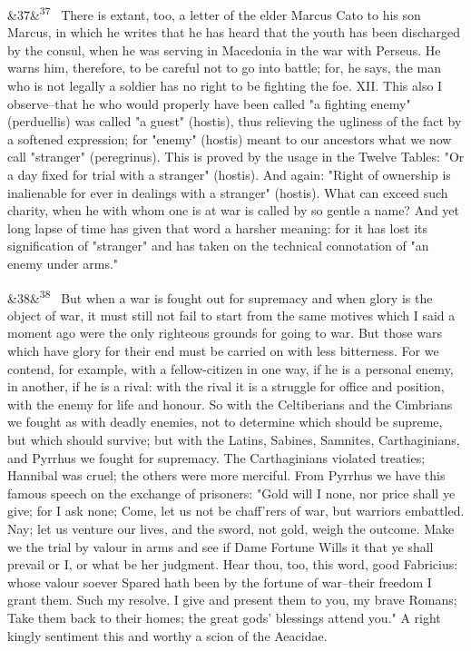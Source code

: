 \documentclass[12pt]{article}
\newcommand{\para}[1][]{\par\noindent\ifx&#1&\else\textsuperscript{\footnotesize #1}~\fi}
\begin{document}
\para[37] There is extant, too, a letter of the elder Marcus Cato to his son Marcus, in which he writes that he has heard that the youth has been discharged by the consul, when he was serving in Macedonia in the war with Perseus. He warns him, therefore, to be careful not to go into battle; for, he says, the man who is not legally a soldier has no right to be fighting the foe. XII. This also I observe--that he who would properly have been called "a fighting enemy" (perduellis) was called "a guest" (hostis), thus relieving the ugliness of the fact by a softened expression; for "enemy" (hostis) meant to our ancestors what we now call "stranger" (peregrinus). This is proved by the usage in the Twelve Tables: "Or a day fixed for trial with a stranger" (hostis). And again: "Right of ownership is inalienable for ever in dealings with a stranger" (hostis). What can exceed such charity, when he with whom one is at war is called by so gentle a name? And yet long lapse of time has given that word a harsher meaning: for it has lost its signification of "stranger" and has taken on the technical connotation of "an enemy under arms."

\para[38] But when a war is fought out for supremacy and when glory is the object of war, it must still not fail to start from the same motives which I said a moment ago were the only righteous grounds for going to war. But those wars which have glory for their end must be carried on with less bitterness. For we contend, for example, with a fellow-citizen in one way, if he is a personal enemy, in another, if he is a rival: with the rival it is a struggle for office and position, with the enemy for life and honour. So with the Celtiberians and the Cimbrians we fought as with deadly enemies, not to determine which should be supreme, but which should survive; but with the Latins, Sabines, Samnites, Carthaginians, and Pyrrhus we fought for supremacy. The Carthaginians violated treaties; Hannibal was cruel; the others were more merciful. From Pyrrhus we have this famous speech on the exchange of prisoners: "Gold will I none, nor price shall ye give; for I ask none; Come, let us not be chaff'rers of war, but warriors embattled. Nay; let us venture our lives, and the sword, not gold, weigh the outcome. Make we the trial by valour in arms and see if Dame Fortune Wills it that ye shall prevail or I, or what be her judgment. Hear thou, too, this word, good Fabricius: whose valour soever Spared hath been by the fortune of war--their freedom I grant them. Such my resolve. I give and present them to you, my brave Romans; Take them back to their homes; the great gods' blessings attend you." A right kingly sentiment this and worthy a scion of the Aeacidae.
\end{document}
